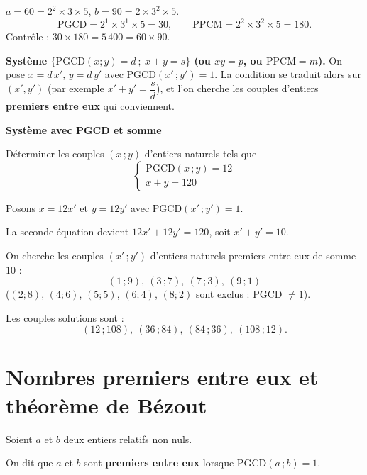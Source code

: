\begin{exemple}
	$a = 60 = 2^2 \times 3 \times 5$, $b = 90 = 2 \times 3^2 \times 5$.
	$$
	\mathrm{PGCD} = 2^1 \times 3^1 \times 5 = 30,
	\qquad
	\mathrm{PPCM} = 2^2 \times 3^2 \times 5 = 180.
	$$
	Contrôle : $30 \times 180 = 5\,400 = 60 \times 90$.
\end{exemple}

\begin{astucebac}
	\textbf{Système $\{\mathrm{PGCD}(x;y) = d\ ;\ x + y = s\}$ (ou $xy = p$,
	ou $\mathrm{PPCM} = m$).} On pose $x = d\,x'$, $y = d\,y'$ avec
	$\mathrm{PGCD}(x'\,;y') = 1$. La condition se traduit alors sur $(x',y')$
	(par exemple $x' + y' = \dfrac{s}{d}$), et l'on cherche les couples
	d'entiers \textbf{premiers entre eux} qui conviennent.
\end{astucebac}

\exerciceresolu
\textbf{Système avec PGCD et somme}

Déterminer les couples $(x\,;y)$ d'entiers naturels tels que
$$
\begin{cases}
	\mathrm{PGCD}(x\,;y) = 12 \\
	x + y = 120
\end{cases}
$$

\solution

Posons $x = 12x'$ et $y = 12y'$ avec $\mathrm{PGCD}(x'\,;y') = 1$.

La seconde équation devient $12x' + 12y' = 120$, soit $x' + y' = 10$.

On cherche les couples $(x'\,;y')$ d'entiers naturels premiers entre eux de
somme $10$ :
$$
(1\,;9),\ (3\,;7),\ (7\,;3),\ (9\,;1)
$$
($(2;8)$, $(4;6)$, $(5;5)$, $(6;4)$, $(8;2)$ sont exclus : PGCD $\neq 1$).

Les couples solutions sont :
$$
\boxed{(12\,;108),\ (36\,;84),\ (84\,;36),\ (108\,;12).}
$$


\section{Nombres premiers entre eux et théorème de Bézout}

\begin{definition}
	Soient $a$ et $b$ deux entiers relatifs non nuls.

	On dit que $a$ et $b$ sont \textbf{premiers entre eux} lorsque $\mathrm{PGCD}(a\,;b) = 1$.
\end{definition}

